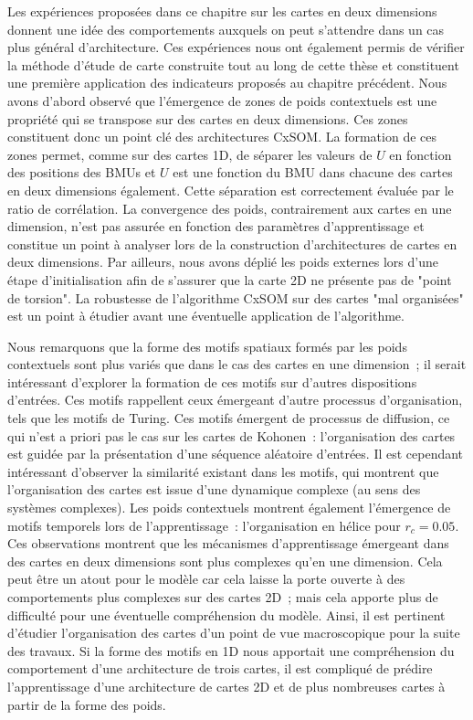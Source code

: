 \documentclass[../main]{subfiles}
\begin{document}
Les expériences proposées dans ce chapitre sur les cartes en deux dimensions donnent une idée des comportements auxquels on peut s'attendre dans un cas plus général d'architecture.
Ces expériences nous ont également permis de vérifier la méthode d'étude de carte construite tout au long de cette thèse et constituent une première application des indicateurs proposés au chapitre précédent.
Nous avons d'abord observé que l'émergence de zones de poids contextuels est une propriété qui se transpose sur des cartes en deux dimensions. Ces zones constituent donc un point clé des architectures CxSOM.
La formation de ces zones permet, comme sur des cartes 1D, de séparer les valeurs de $U$ en fonction des positions des BMUs et $U$ est une fonction du BMU dans chacune des cartes en deux dimensions également.
Cette séparation est correctement évaluée par le ratio de corrélation.
La convergence des poids, contrairement aux cartes en une dimension, n'est pas assurée en fonction des paramètres d'apprentissage et constitue un point à analyser lors de la construction d'architectures de cartes en deux dimensions. 
Par ailleurs, nous avons déplié les poids externes lors d'une étape d'initialisation afin de s'assurer que la carte 2D ne présente pas de "point de torsion". La robustesse de l'algorithme CxSOM sur des cartes "mal organisées" est un point à étudier avant une éventuelle application de l'algorithme.


Nous remarquons que la forme des motifs spatiaux formés par les poids contextuels sont plus variés que dans le cas des cartes en une dimension~; il serait intéressant d'explorer la formation de ces motifs sur d'autres dispositions d'entrées. Ces motifs rappellent ceux émergeant d'autre processus d'organisation, tels que les motifs de Turing. Ces motifs émergent de processus de diffusion, ce qui n'est a priori pas le cas sur les cartes de Kohonen~: l'organisation des cartes est guidée par la présentation d'une séquence aléatoire d'entrées. Il est cependant intéressant d'observer la similarité existant dans les motifs, qui montrent que l'organisation des cartes est issue d'une dynamique complexe (au sens des systèmes complexes).
Les poids contextuels montrent également l'émergence de motifs temporels lors de l'apprentissage~: l'organisation en hélice pour $r_c = 0.05$. Ces observations montrent que les mécanismes d'apprentissage émergeant dans des cartes en deux dimensions sont plus complexes qu'en une dimension. Cela peut être un atout pour le modèle car cela laisse la porte ouverte à des comportements plus complexes sur des cartes 2D~; mais cela apporte plus de difficulté pour une éventuelle compréhension du modèle.
Ainsi, il est pertinent d'étudier l'organisation des cartes d'un point de vue macroscopique pour la suite des travaux. Si la forme des motifs en 1D nous apportait une compréhension du comportement d'une architecture de trois cartes, il est compliqué de prédire l'apprentissage d'une architecture de cartes 2D et de plus nombreuses cartes à partir de la forme des poids.
\end{document}
